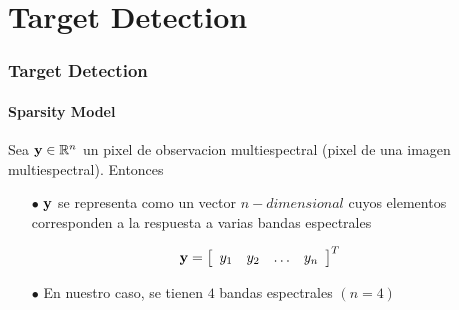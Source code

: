 \documentclass[spanish,xcolor=dvipsnames]{beamer}
\begin{document}
    \section{Target Detection}
  
    \begin{frame}
    	\frametitle{Target Detection}
    	\framesubtitle{Sparsity Model}
    
    Sea ${\bf y} \in \mathbb{R}^{n}$  un pixel de observacion multiespectral (pixel de una imagen multiespectral). Entonces\\

	\begin{itemize}
    		\item[\color {black}\bf $\bullet$] ${\bf y}$ se representa como un vector $n-dimensional$ cuyos elementos corresponden a la respuesta a varias bandas espectrales\\
	\end{itemize}

    	\begin{equation}
		\nonumber {\bf y}= {\left[ \begin{array}{cccc} {y}_1 & {y}_2 & \ldots & {y}_n \end{array}  \right]}^T 
	\end{equation}
    	
	\begin{itemize}
    		\item[\color {black}\bf $\bullet$] En nuestro caso, se tienen $4$ bandas espectrales $(n=4)$ 
	\end{itemize}
  
    \end{frame}
    
\end{document}

